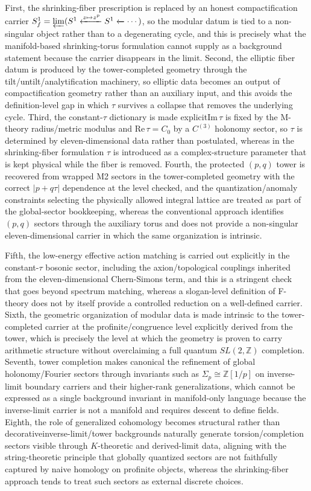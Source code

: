 \documentclass[11pt]{article}
\theoremstyle{remark}
\newcommand{\Z}{\mathbb{Z}}
\begin{document}
First, the shrinking-fiber prescription is replaced by an honest compactification carrier \(S_f^{1}=\varprojlim(S^{1}\xleftarrow{z\mapsto z^{p}}S^{1}\xleftarrow{}\cdots)\), so the modular datum is tied to a non-singular object rather than to a degenerating cycle, and this is precisely what the manifold-based shrinking-torus formulation cannot supply as a background statement because the carrier disappears in the limit. Second, the elliptic fiber datum is produced by the tower-completed geometry through the tilt/untilt/analytification machinery, so elliptic data becomes an output of compactification geometry rather than an auxiliary input, and this avoids the definition-level gap in which \(\tau\) survives a collapse that removes the underlying cycle. Third, the constant-\(\tau\) dictionary is made explicit\:\(\mathrm{Im}\,\tau\) is fixed by the M-theory radius/metric modulus and \(\mathrm{Re}\,\tau=C_{0}\) by a \(C^{(3)}\) holonomy sector, so \(\tau\) is determined by eleven-dimensional data rather than postulated, whereas in the shrinking-fiber formulation \(\tau\) is introduced as a complex-structure parameter that is kept physical while the fiber is removed. Fourth, the protected \((p,q)\) tower is recovered from wrapped M2 sectors in the tower-completed geometry with the correct \(|p+q\tau|\) dependence at the level checked, and the quantization/anomaly constraints selecting the physically allowed integral lattice are treated as part of the global-sector bookkeeping, whereas the conventional approach identifies \((p,q)\) sectors through the auxiliary torus and does not provide a non-singular eleven-dimensional carrier in which the same organization is intrinsic. 

Fifth, the low-energy effective action matching is carried out explicitly in the constant-\(\tau\) bosonic sector, including the axion/topological couplings inherited from the eleven-dimensional Chern-Simons term, and this is a stringent check that goes beyond spectrum matching, whereas a slogan-level definition of F-theory does not by itself provide a controlled reduction on a well-defined carrier. Sixth, the geometric organization of modular data is made intrinsic to the tower-completed carrier at the profinite/congruence level explicitly derived from the tower, which is precisely the level at which the geometry is proven to carry arithmetic structure without overclaiming a full quantum \(SL(2,\Z)\) completion. Seventh, tower completion makes canonical the refinement of global holonomy/Fourier sectors through invariants such as \(\widehat{\Sigma_{p}}\cong \Z[1/p]\) on inverse-limit boundary carriers and their higher-rank generalizations, which cannot be expressed as a single background invariant in manifold-only language because the inverse-limit carrier is not a manifold and requires descent to define fields. Eighth, the role of generalized cohomology becomes structural rather than decorative\:inverse-limit/tower backgrounds naturally generate torsion/completion sectors visible through \(K\)-theoretic and derived-limit data, aligning with the string-theoretic principle that globally quantized sectors are not faithfully captured by naive homology on profinite objects, whereas the shrinking-fiber approach tends to treat such sectors as external discrete choices. 
\end{document}
